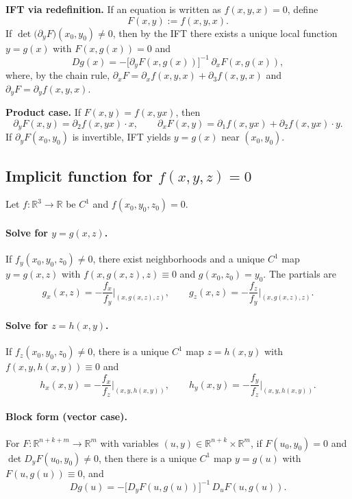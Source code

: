 \documentclass[12pt,a4paper]{article}
\theoremstyle{plain}
\theoremstyle{definition}
\theoremstyle{remark}
\theoremstyle{remark}
\begin{document}
	\textbf{IFT via redefinition.} If an equation is written as $f(x,y,x)=0$, define
	\[
	F(x,y):=f(x,y,x).
	\]
	If $\det\big(\partial_y F\big)(x_0,y_0)\neq0$, then by the IFT there exists a unique
	local function $y=g(x)$ with $F(x,g(x))=0$ and
	\[
	Dg(x)=-\big[\partial_y F(x,g(x))\big]^{-1}\,\partial_x F(x,g(x)),
	\]
	where, by the chain rule,
	$\partial_x F=\partial_x f(x,y,x)+\partial_{3} f(x,y,x)$ and
	$\partial_y F=\partial_y f(x,y,x)$.
	
	\medskip
	\textbf{Product case.} If $F(x,y)=f(x, yx)$, then
	\[
	\partial_y F(x,y)=\partial_2 f(x,yx)\cdot x,\qquad
	\partial_x F(x,y)=\partial_1 f(x,yx)+\partial_2 f(x,yx)\cdot y.
	\]
	If $\partial_y F(x_0,y_0)$ is invertible, IFT yields $y=g(x)$ near $(x_0,y_0)$.
	
	
	\subsection*{Implicit function for $f(x,y,z)=0$}
	
	Let $f:\mathbb R^3\to\mathbb R$ be $C^1$ and $f(x_0,y_0,z_0)=0$.
	
	\paragraph{Solve for $y=g(x,z)$.}
	If $f_y(x_0,y_0,z_0)\neq 0$, there exist neighborhoods and a unique $C^1$ map
	$y=g(x,z)$ with $f(x,g(x,z),z)\equiv 0$ and $g(x_0,z_0)=y_0$. The partials are
	\[
	g_x(x,z)= -\frac{f_x}{f_y}\Big|_{(x,g(x,z),z)},\qquad
	g_z(x,z)= -\frac{f_z}{f_y}\Big|_{(x,g(x,z),z)}.
	\]
	
	\paragraph{Solve for $z=h(x,y)$.}
	If $f_z(x_0,y_0,z_0)\neq 0$, there is a unique $C^1$ map $z=h(x,y)$ with
	$f(x,y,h(x,y))\equiv 0$ and
	\[
	h_x(x,y)= -\frac{f_x}{f_z}\Big|_{(x,y,h(x,y))},\qquad
	h_y(x,y)= -\frac{f_y}{f_z}\Big|_{(x,y,h(x,y))}.
	\]
	
	\paragraph{Block form (vector case).}
	For $F:\mathbb R^{n+k+m}\to\mathbb R^m$ with variables $(u,y)\in\mathbb R^{n+k}\times\mathbb R^{m}$,
	if $F(u_0,y_0)=0$ and $\det D_y F(u_0,y_0)\neq 0$, then there is a unique $C^1$ map
	$y=g(u)$ with $F(u,g(u))\equiv 0$, and
	\[
	Dg(u)= -\big[D_y F(u,g(u))\big]^{-1}\,D_u F(u,g(u)).
	\]
	
\end{document}
